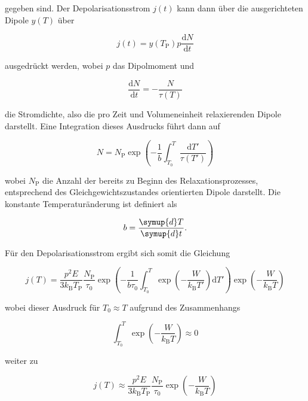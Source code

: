 gegeben sind. Der Depolarisationsstrom $j(t)$ kann dann über die ausgerichteten 
Dipole $y(T)$ über 

\begin{equation*}
    j(t) = y(T_{\mathrm{P}}) p \frac{\mathrm{d}N}{\mathrm{d}t}
\end{equation*}

ausgedrückt werden, wobei $p$ das Dipolmoment und 

\begin{equation*}
    \frac{\mathrm{d}N}{\mathrm{d}t} = -\frac{N}{\tau(T)}
\end{equation*}

die Stromdichte, also die pro Zeit und Volumeneinheit relaxierenden Dipole darstellt.
Eine Integration dieses Ausdrucks führt dann auf 

\begin{equation*}
    N = N_{\mathrm{P}} \exp{ \left( - \frac{ 1 }{ b } \int_{T_0}^T \frac{ \mathrm{d}T' }{ \tau(T') } \right )}
\end{equation*}

wobei $N_{\text{P}}$ die Anzahl der bereits zu Beginn des Relaxationsprozesses,
entsprechend des Gleichgewichtszustandes orientierten Dipole darstellt.
Die konstante Temperaturänderung ist definiert als

\begin{equation*}
    b = \frac{\symup{d}T}{\symup{d}t}.
\end{equation*}

Für den Depolarisationsstrom ergibt sich somit die Gleichung 

\begin{equation}
    \label{eq:j_T}
    j(T) = \frac{ p^{2} E }{ 3 k_{\mathrm{B}} T_{\mathrm{P}} } \frac{ N_{\mathrm{P}} }{ \tau_{\text{0}} } \exp{ \left( - \frac{ 1 }{ b \tau_{\text{0}} } \int_{T_{\text{0}}}^T \exp{ \left( - \frac{ W }{ k_{\mathrm{B}} T' } \right) \mathrm{d}T' } \right) } \exp{ \left( -\frac{ W }{ k_{\mathrm{B}} T } \right) } 
\end{equation}

wobei dieser Ausdruck für $T_{\text{0}} \approx T$ aufgrund des 
Zusammenhangs

\begin{equation*}
    \int_{T_{\text{0}}}^T \exp{ \left( - \frac{ W }{ k_{\mathrm{B}} T } \right )} \approx 0  
\end{equation*}

weiter zu 

\begin{equation}
    j(T) \approx \frac{ p^{2} E }{ 3 k_{\mathrm{B}} T_{\mathrm{P} }} \frac{ N_{\mathrm{P}} }{ \tau_{\text{0}} } \exp{ \left( - \frac{ W }{ k_{\mathrm{B}} T} \right ) }
    \label{eq2}
\end{equation}

